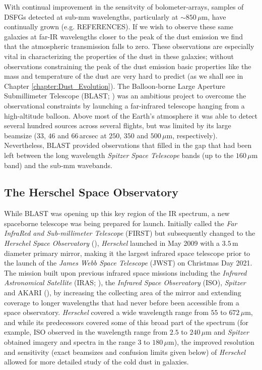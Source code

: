With continual improvement in the sensitvity of bolometer-arrays, samples of DSFGs detected at sub-mm wavelengths, particularly at $\sim 850\,\mu$m, have continually grown (e.g. {\color{red}REFERENCES}). If we wish to observe these same galaxies at far-IR wavelengths closer to the peak of the dust emission we find that the atmospheric transmission falls to zero. These observations are especially vital in characterizing the properties of the dust in these galaxies; without observations constraining the peak of the dust emission basic properties like the mass and temperature of the dust are very hard to predict (as we shall see in Chapter \ref{chapter:Dust_Evolution}). The Balloon-borne Large Aperture Submillimeter Telescope (BLAST; \citealt{Devlin_2009}) was an ambitious project to overcome the observational constraints by launching a far-infrared telescope hanging from a high-altitude balloon. Above most of the Earth's atmosphere it was able to detect several hundred sources across several flights, but was limited by its large beamsize ($33$, $46$ and $66\,$arcsec at $250$, $350$ and $500\,\mu$m, respectively). Nevertheless, BLAST provided observations that filled in the gap that had been left between the long wavelength \textit{Spitzer Space Telescope} bands (up to the $160\,\mu$m band) and the sub-mm wavebands.

\subsection{The Herschel Space Observatory}

While BLAST was opening up this key region of the IR spectrum, a new spaceborne telescope was being prepared for launch. Initially called the \textit{Far InfraRed and Sub-millimeter Telescope} (FIRST) but subsequently changed to the \textit{Herschel Space Observatory} (\citealt{Pilbratt_2010}), \textit{Herschel} launched in May 2009 with a $3.5\,$m diameter primary mirror, making it the largest infrared space telescope prior to the launch of the \textit{James Webb Space Telescope} (JWST) on Christmas Day 2021. The mission built upon previous infrared space missions including the \textit{Infrared Astronomical Satellite} (IRAS; \citealt{Neugebauer_1984}), the \textit{Infrared Space Observatory} (ISO), \textit{Spitzer} and AKARI (\citealt{Murakami_2007}), by increasing the collecting area of the mirror and extending coverage to longer wavelengths that had never before been accessible from a space observatory. \textit{Herschel} covered a wide wavelength range from $55$ to $672\,\mu$m, and while its predecessors covered some of this broad part of the spectrum (for example, ISO observed in the wavelength range from $2.5$ to $240\,\mu$m and \textit{Spitzer} obtained imagery and spectra in the range $3$ to $180\,\mu$m), the improved resolution and sensitivity (exact beamsizes and confusion limits given below) of \textit{Herschel} allowed for more detailed study of the cold dust in galaxies.

